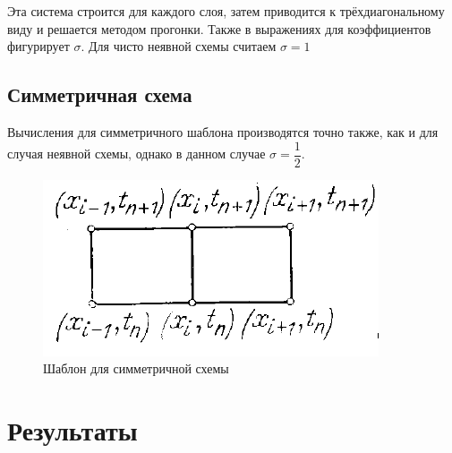 \documentclass[12pt]{article}
\begin{document}
Эта система строится для каждого слоя, затем приводится к трёхдиагональному виду и решается методом прогонки. 
Также в выражениях для коэффициентов фигурирует $\sigma$. Для чисто неявной схемы считаем $\sigma=1$ 

\newpage
\subsection{Симметричная схема}

Вычисления для симметричного шаблона производятся точно также, как и для случая неявной схемы, однако в данном случае $\sigma = \dfrac{1}{2}$. 

\begin{figure}[h]
\begin{center}
\includegraphics[scale = 0.8]{sym.png} 
\end{center}
\caption{Шаблон для симметричной схемы}
\end{figure}

\section{Результаты}
\end{document}
